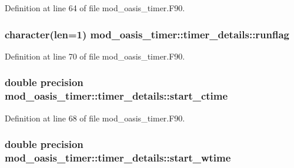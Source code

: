 Definition at line 64 of file mod\+\_\+oasis\+\_\+timer.\+F90.

\hypertarget{structmod__oasis__timer_1_1timer__details_ac91fc6e6c7d8bca9c4519b506714384a}{
\subsubsection[{runflag}]{\setlength{\rightskip}{0pt plus 5cm}character(len=1) mod\+\_\+oasis\+\_\+timer\+::timer\+\_\+details\+::runflag\hspace{0.3cm}{\ttfamily [private]}}}\label{structmod__oasis__timer_1_1timer__details_ac91fc6e6c7d8bca9c4519b506714384a}


Definition at line 70 of file mod\+\_\+oasis\+\_\+timer.\+F90.

\hypertarget{structmod__oasis__timer_1_1timer__details_a2922806fc675af7b8aa9ab042bddfc24}{
\subsubsection[{start\+\_\+ctime}]{\setlength{\rightskip}{0pt plus 5cm}double precision mod\+\_\+oasis\+\_\+timer\+::timer\+\_\+details\+::start\+\_\+ctime\hspace{0.3cm}{\ttfamily [private]}}}\label{structmod__oasis__timer_1_1timer__details_a2922806fc675af7b8aa9ab042bddfc24}


Definition at line 68 of file mod\+\_\+oasis\+\_\+timer.\+F90.

\hypertarget{structmod__oasis__timer_1_1timer__details_a1b05dff81a75201d26ba232a265f70d0}{
\subsubsection[{start\+\_\+wtime}]{\setlength{\rightskip}{0pt plus 5cm}double precision mod\+\_\+oasis\+\_\+timer\+::timer\+\_\+details\+::start\+\_\+wtime\hspace{0.3cm}{\ttfamily [private]}}}\label{structmod__oasis__timer_1_1timer__details_a1b05dff81a75201d26ba232a265f70d0}


